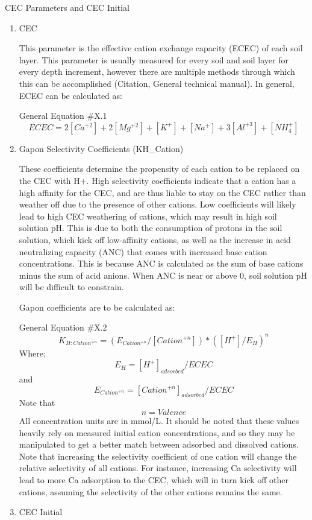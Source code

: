 \documentclass[
]{article}
\begin{document}
CEC Parameters and CEC Initial

\begin{enumerate}
\def\labelenumi{\arabic{enumi}.}
\item
  CEC

  This parameter is the effective cation exchange capacity (ECEC) of
  each soil layer. This parameter is usually measured for every soil and
  soil layer for every depth increment, however there are multiple
  methods through which this can be accomplished (Citation, General
  technical manual). In general, ECEC can be calculated as:

  General Equation \#X.1 \[
  ECEC= 2[Ca^{+2}]+ 2[Mg^{+2}]+[K^+]+[Na^+]+3[Al^{+3}]+[NH_{4}^{+}]
  \]
\item
  Gapon Selectivity Coefficients (KH\_Cation)

  These coefficients determine the propensity of each cation to be
  replaced on the CEC with H+. High selectivity coefficients indicate
  that a cation has a high affinity for the CEC, and are thus liable to
  stay on the CEC rather than weather off due to the presence of other
  cations. Low coefficients will likely lead to high CEC weathering of
  cations, which may result in high soil solution pH. This is due to
  both the consumption of protons in the soil solution, which kick off
  low-affinity cations, as well as the increase in acid neutralizing
  capacity (ANC) that comes with increased base cation concentrations.
  This is because ANC is calculated as the sum of base cations minus the
  sum of acid anions. When ANC is near or above 0, soil solution pH will
  be difficult to constrain.

  Gapon coefficients are to be calculated as:

  General Equation \#X.2 \[
  K_{H:Cation^{+n}}= (E_{Cation^{+n}}/[Cation^{+n}])*([H^{+}]/E_{H})^{n}
  \] Where; \[
  E_{H}=[H^{+}]_{adsorbed}/ECEC
  \] and \[
  E_{Cation^{+n}}=[Cation^{+n}]_{adsorbed}/ECEC
  \] Note that \[
  n = Valence
  \] All concentration units are in mmol/L. It should be noted that
  these values heavily rely on measured initial cation concentrations,
  and so they may be manipulated to get a better match between adsorbed
  and dissolved cations. Note that increasing the selectivity
  coefficient of one cation will change the relative selectivity of all
  cations. For instance, increasing Ca selectivity will lead to more Ca
  adsorption to the CEC, which will in turn kick off other cations,
  assuming the selectivity of the other cations remains the same.
\item
  CEC Initial


\end{enumerate}
\end{document}
